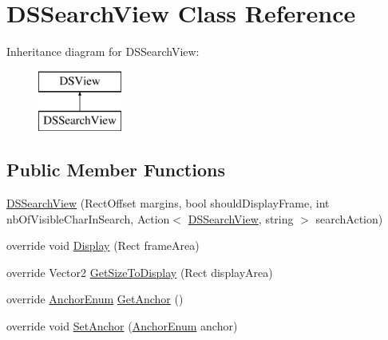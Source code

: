 \hypertarget{class_d_s_search_view}{\section{D\+S\+Search\+View Class Reference}
\label{class_d_s_search_view}
}
Inheritance diagram for D\+S\+Search\+View\+:\begin{figure}[H]
\begin{center}
\leavevmode
\includegraphics[height=2.000000cm]{class_d_s_search_view}
\end{center}
\end{figure}
\subsection*{Public Member Functions}
\begin{DoxyCompactItemize}
\item 
\hyperlink{class_d_s_search_view_a1e7d6fcca6fe06d077f13034009914ff}{D\+S\+Search\+View} (Rect\+Offset margins, bool should\+Display\+Frame, int nb\+Of\+Visible\+Char\+In\+Search, Action$<$ \hyperlink{class_d_s_search_view}{D\+S\+Search\+View}, string $>$ search\+Action)
\item 
override void \hyperlink{class_d_s_search_view_a2d36ca2bec73d76dea3b4aa3375f99a6}{Display} (Rect frame\+Area)
\item 
override Vector2 \hyperlink{class_d_s_search_view_a67815d1ed59bd692e1e31cc90aa2a2d7}{Get\+Size\+To\+Display} (Rect display\+Area)
\item 
override \hyperlink{class_d_s_view_a8b41b9ec1b18bd33872a37cbd3a2dbe1}{Anchor\+Enum} \hyperlink{class_d_s_search_view_a288b8d74a34c41ed47a6041715abfc51}{Get\+Anchor} ()
\item 
override void \hyperlink{class_d_s_search_view_a00684cec4f43fcf2f9d112facfc9ec20}{Set\+Anchor} (\hyperlink{class_d_s_view_a8b41b9ec1b18bd33872a37cbd3a2dbe1}{Anchor\+Enum} anchor)
\end{DoxyCompactItemize}
